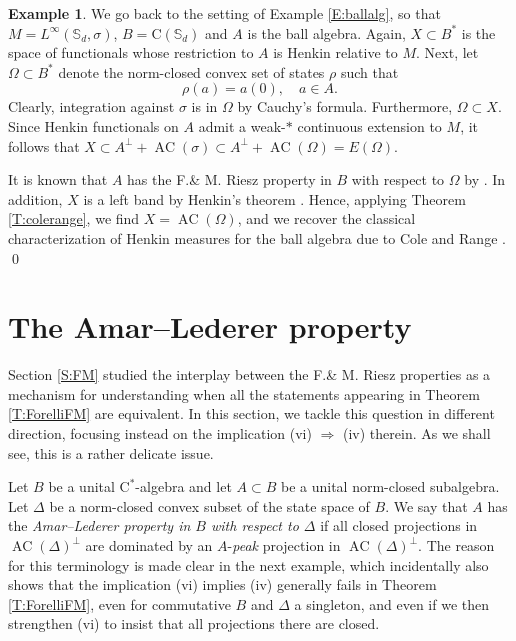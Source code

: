 \documentclass[10pt]{amsart}
\newcommand{\bS}{{\mathbb{S}}}
\newcommand{\rC}{\mathrm{C}}
\newcommand{\AC}{\operatorname{AC}}
\theoremstyle{definition}
\newtheorem{example}{Example}
\begin{document}
\begin{example}\label{E:AB}
We go back to the setting of Example \ref{E:ballalg}, so that $M=L^\infty(\bS_d,\sigma)$, $B=\rC(\bS_d)$ and $A$ is the ball algebra. Again, $X\subset B^*$ is the space of functionals whose restriction to $A$ is Henkin relative to $M$.  Next, let $\Omega\subset B^*$ denote the norm-closed convex set of states $\rho$ such that 
\[
\rho(a)=a(0),\quad a\in A.
\]
Clearly,  integration against $\sigma$ is in $\Omega$ by Cauchy's formula. Furthermore,  $\Omega \subset X$. 
Since Henkin functionals on $A$  admit a weak-$*$ continuous extension to $M$, it follows that $X\subset A^\perp+\AC(\sigma)\subset A^\perp+\AC(\Omega)=E(\Omega)$. 

It is known that $A$ has the F.\& M. Riesz property in $B$ with respect to $\Omega$ by \cite[Theorem 9.5.6]{rudin2008}. In addition, $X$ is a left band by Henkin's theorem \cite[Theorem 9.3.1]{rudin2008}. Hence, applying Theorem \ref{T:colerange}, we find $X=\AC(\Omega)$, and we recover the classical characterization of Henkin measures for the ball algebra due to Cole and Range \cite[Theorem 9.6.1]{rudin2008}. \qed
\end{example}


\section{The Amar--Lederer property}\label{S:AL}

Section \ref{S:FM} studied the interplay between the F.\& M. Riesz properties as a mechanism for understanding when all the statements appearing in Theorem \ref{T:ForelliFM} are equivalent. In this section, we tackle this question in different direction, focusing instead on the implication (vi) $\Rightarrow$ (iv) therein. As we shall see, this is a rather delicate issue.

Let $B$ be a unital $\rC^*$-algebra and let $A\subset B$ be a unital norm-closed subalgebra. Let $\Delta$ be a norm-closed convex subset of the state space of $B$. We say that $A$ has the \emph{Amar--Lederer property in $B$ with respect to $\Delta$} if all closed projections in $\AC(\Delta)^\perp$ are dominated by an $A$-{\em peak} projection in $\AC(\Delta)^\perp$. The reason for this terminology is made clear in the next example, which incidentally also shows that the implication  (vi) implies (iv) generally fails in Theorem \ref{T:ForelliFM}, even for commutative $B$ and $\Delta$ a singleton, and even if we then strengthen (vi) to insist that
all projections there are closed.
\end{document}
